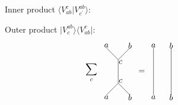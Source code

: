 \documentclass{article}
\begin{document}
\begin{figure}[h]
  \centering
    \begin{minipage}{0.45\textwidth}
      \centering
      \color{blue}
      \footnotesize{Inner product $\langle V^{c}_{ab} \vert V_{c^\prime}^{ab} \rangle$:}\\
      \color{black}
    \end{minipage}
    \hfill
    \begin{minipage}{0.45\textwidth}
      \centering
      \color{blue}
      \footnotesize{Outer product $\vert V^{ab}_c \rangle \langle V^{c}_{ab} \vert$:}
      \color{black}
      \begin{equation*}
        \sum_{c} 
        \raisebox{-38pt}{
        \begin{tikzpicture}
          \node at (0.0, 2.1) {$a$};
          \node at (1.0, 2.1) {$b$};
          \draw [-] plot coordinates {(1.0, 2.0) (0.5, 1.5)};
          \draw [-] plot coordinates {(0.0, 2.0) (0.5, 1.5)};
          \draw [-] plot coordinates {(0.5, 1.5) (0.5, 0.5)};
          \node at (0.0, -0.1) {$a$};
          \node at (1.0, -0.1) {$b$};
          \node at (0.6, 1.4) {$c$};
          \draw [-] plot coordinates {(0.5, 0.5) (1.0, 0.0)};
          \draw [-] plot coordinates {(0.5, 0.5) (0.0, 0.0)};
          \node at (0.6, 0.6) {$c$};
          \node at (1.5,1.0) {$=$};
          \node at (2.0, 2.1) {$a$};
          \node at (2.75, 2.1) {$b$};
          \draw [-] plot coordinates {(2.0,2.0) (2.0,0.0)};
          \draw [-] plot coordinates {(2.75,2.0) (2.75, 0.0)};
          \node at (2.0, -0.1) {$a$};
          \node at (2.75, -0.1) {$b$};
        \end{tikzpicture}}
      \end{equation*}
     
    \end{minipage}
\end{figure}
\vspace{0.5cm}
\end{document}
